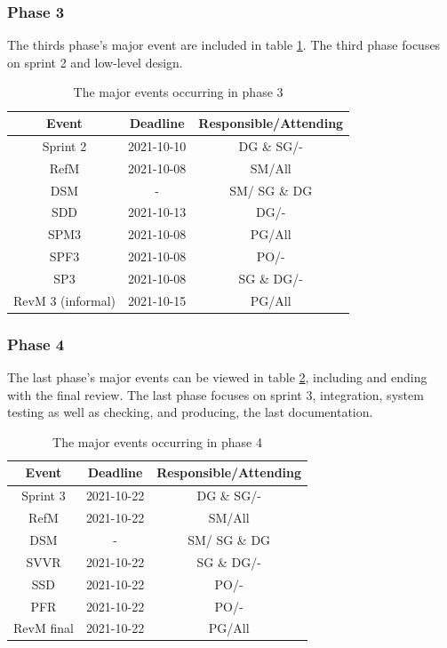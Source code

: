 \documentclass{article}
\begin{document}
\subsubsection{Phase 3}
The thirds phase's major event are included in table \ref{tab:phase3}. The third phase focuses on sprint 2 and low-level design. 
\begin{table}[H]
    \centering
    \begin{tabular}{|c|c|c|}
    \hline
        Event & Deadline & Responsible/Attending \\
        \hline \hline
        Sprint 2 & 2021-10-10 & DG \& SG/- \\
        \hline
        RefM & 2021-10-08 & SM/All \\
        \hline
        DSM & - & SM/ SG \& DG \\
        \hline
        SDD & 2021-10-13 & DG/- \\
        \hline
        SPM3 & 2021-10-08 & PG/All \\
        \hline
        SPF3 & 2021-10-08 & PO/- \\
        \hline
        SP3 & 2021-10-08 & SG \& DG/- \\
        \hline
        RevM 3 (informal) & 2021-10-15 & PG/All \\
        \hline
    \end{tabular}
    \caption{The major events occurring in phase 3}
    \label{tab:phase3}
\end{table}

\subsubsection{Phase 4}
The last phase's major events can be viewed in table \ref{tab:phase4}, including and ending with the final review. The last phase focuses on sprint 3, integration, system testing as well as checking, and producing, the last documentation.
\begin{table}[H]
    \centering
    \begin{tabular}{|c|c|c|}
    \hline
        Event & Deadline & Responsible/Attending \\
        \hline \hline
        Sprint 3 & 2021-10-22 & DG \& SG/- \\
        \hline
        RefM & 2021-10-22 & SM/All \\
        \hline
        DSM & - & SM/ SG \& DG\\
        \hline
        SVVR & 2021-10-22 & SG \& DG/- \\
        \hline
        SSD & 2021-10-22 & PO/- \\
        \hline
        PFR & 2021-10-22 & PO/- \\
        \hline
        RevM final & 2021-10-22 & PG/All \\
        \hline
    \end{tabular}
    \caption{The major events occurring in phase 4}
    \label{tab:phase4}
\end{table}
\end{document}
